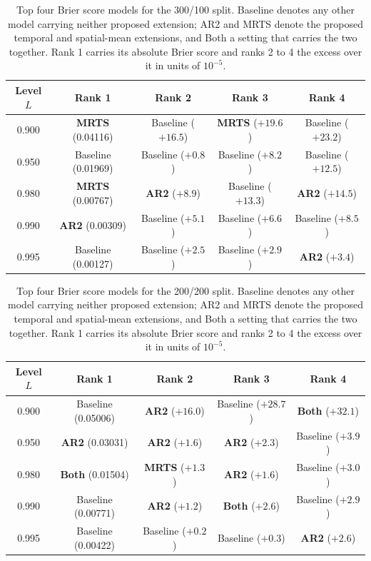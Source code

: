 \documentclass[12pt]{article}
\begin{document}
\begin{table}[htbp]
\centering
\caption[Top four Brier score models for the 300/100 split]{Top four Brier score models for the 300/100 split.  Baseline denotes any other model carrying neither proposed extension; AR2 and MRTS denote the proposed temporal and spatial-mean extensions, and Both a setting that carries the two together.  Rank 1 carries its absolute Brier score and ranks 2 to 4 the excess over it in units of $10^{-5}$.}
\label{tab:ozone-top4-quantile-300-100}
\scriptsize
\begin{tabular}{@{}ccccc@{}}
\toprule
Level $L$ & Rank 1 & Rank 2 & Rank 3 & Rank 4 \\
\midrule
0.900 & \textbf{MRTS} (0.04116) & Baseline ($+16.5$) & \textbf{MRTS} ($+19.6$) & Baseline ($+23.2$) \\
0.950 & Baseline (0.01969) & Baseline ($+0.8$) & Baseline ($+8.2$) & Baseline ($+12.5$) \\
0.980 & \textbf{MRTS} (0.00767) & \textbf{AR2} ($+8.9$) & Baseline ($+13.3$) & \textbf{AR2} ($+14.5$) \\
0.990 & \textbf{AR2} (0.00309) & Baseline ($+5.1$) & Baseline ($+6.6$) & Baseline ($+8.5$) \\
0.995 & Baseline (0.00127) & Baseline ($+2.5$) & Baseline ($+2.9$) & \textbf{AR2} ($+3.4$) \\
\bottomrule
\end{tabular}
\end{table}


\begin{table}[htbp]
\centering
\caption[Top four Brier score models for the 200/200 split]{Top four Brier score models for the 200/200 split.  Baseline denotes any other model carrying neither proposed extension; AR2 and MRTS denote the proposed temporal and spatial-mean extensions, and Both a setting that carries the two together.  Rank 1 carries its absolute Brier score and ranks 2 to 4 the excess over it in units of $10^{-5}$.}
\label{tab:ozone-top4-quantile-200-200}
\scriptsize
\begin{tabular}{@{}ccccc@{}}
\toprule
Level $L$ & Rank 1 & Rank 2 & Rank 3 & Rank 4 \\
\midrule
0.900 & Baseline (0.05006) & \textbf{AR2} ($+16.0$) & Baseline ($+28.7$) & \textbf{Both} ($+32.1$) \\
0.950 & \textbf{AR2} (0.03031) & \textbf{AR2} ($+1.6$) & \textbf{AR2} ($+2.3$) & Baseline ($+3.9$) \\
0.980 & \textbf{Both} (0.01504) & \textbf{MRTS} ($+1.3$) & \textbf{AR2} ($+1.6$) & Baseline ($+3.0$) \\
0.990 & Baseline (0.00771) & \textbf{AR2} ($+1.2$) & \textbf{Both} ($+2.6$) & Baseline ($+2.9$) \\
0.995 & Baseline (0.00422) & Baseline ($+0.2$) & Baseline ($+0.3$) & \textbf{AR2} ($+2.6$) \\
\bottomrule
\end{tabular}
\end{table}
\end{document}
